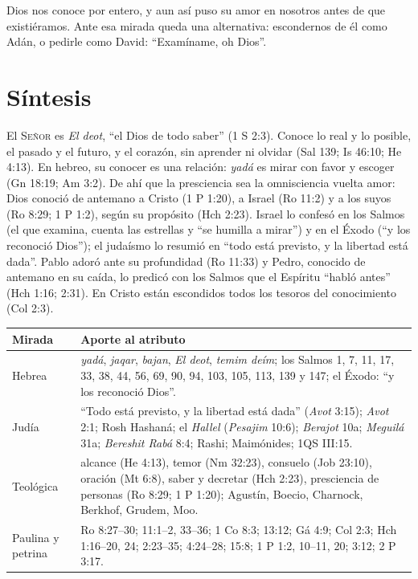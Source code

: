 \documentclass[11pt,letterpaper]{article}
\newcommand{\SENOR}{\textsc{Señor}}
\begin{document}
\begin{tcolorbox}[colback=papiro,colframe=dorado,boxrule=1.4pt,arc=3pt]
\centering Dios nos conoce por entero, y aun así puso su amor en nosotros antes de que existiéramos. Ante esa mirada queda una alternativa: escondernos de él como Adán, o pedirle como David: ``Examíname, oh Dios''.
\end{tcolorbox}

\section{Síntesis}

\begin{tcolorbox}[colback=papiro,colframe=azul,boxrule=1pt,arc=3pt]
El \SENOR{} es \emph{El deot}, ``el Dios de todo saber'' (1 S 2:3). Conoce lo real y lo posible, el pasado y el futuro, y el corazón, sin aprender ni olvidar (Sal 139; Is 46:10; He 4:13). En hebreo, su conocer es una relación: \emph{yadá} es mirar con favor y escoger (Gn 18:19; Am 3:2). De ahí que la presciencia sea la omnisciencia vuelta amor: Dios conoció de antemano a Cristo (1 P 1:20), a Israel (Ro 11:2) y a los suyos (Ro 8:29; 1 P 1:2), según su propósito (Hch 2:23). Israel lo confesó en los Salmos (el que examina, cuenta las estrellas y ``se humilla a mirar'') y en el Éxodo (``y los reconoció Dios''); el judaísmo lo resumió en ``todo está previsto, y la libertad está dada''. Pablo adoró ante su profundidad (Ro 11:33) y Pedro, conocido de antemano en su caída, lo predicó con los Salmos que el Espíritu ``habló antes'' (Hch 1:16; 2:31). En Cristo están escondidos todos los tesoros del conocimiento (Col 2:3).
\end{tcolorbox}

\begin{center}\small\renewcommand{\arraystretch}{1.3}
\begin{tabular}{@{}L{3.0cm}L{11.4cm}@{}}
\toprule
\textbf{Mirada} & \textbf{Aporte al atributo} \\ \midrule
Hebrea & \emph{yadá}, \emph{jaqar}, \emph{bajan}, \emph{El deot}, \emph{temim deím}; los Salmos 1, 7, 11, 17, 33, 38, 44, 56, 69, 90, 94, 103, 105, 113, 139 y 147; el Éxodo: ``y los reconoció Dios''. \\
Judía & ``Todo está previsto, y la libertad está dada'' (\emph{Avot} 3:15); \emph{Avot} 2:1; Rosh Hashaná; el \emph{Hallel} (\emph{Pesajim} 10:6); \emph{Berajot} 10a; \emph{Meguilá} 31a; \emph{Bereshit Rabá} 8:4; Rashi; Maimónides; 1QS III:15. \\
Teológica & alcance (He 4:13), temor (Nm 32:23), consuelo (Job 23:10), oración (Mt 6:8), saber y decretar (Hch 2:23), presciencia de personas (Ro 8:29; 1 P 1:20); Agustín, Boecio, Charnock, Berkhof, Grudem, Moo. \\
Paulina y petrina & Ro 8:27--30; 11:1--2, 33--36; 1 Co 8:3; 13:12; Gá 4:9; Col 2:3; Hch 1:16--20, 24; 2:23--35; 4:24--28; 15:8; 1 P 1:2, 10--11, 20; 3:12; 2 P 3:17. \\
\bottomrule
\end{tabular}\end{center}
\end{document}
